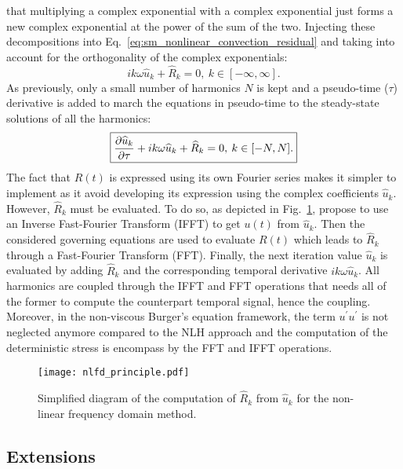 that multiplying a complex exponential with a complex exponential
just forms a new complex exponential at the power of the sum of the
two.
Injecting these decompositions into 
Eq.~\eqref{eq:sm_nonlinear_convection_residual} and taking into account
for the orthogonality of the complex exponentials:
\begin{equation}
	i k \omega \widehat{u}_k + \widehat{R}_k = 0, \: k \in [-\infty, \infty].
\end{equation}
As previously, only a small number of harmonics $N$ is kept and 
a pseudo-time ($\tau$) derivative is added to march the equations
in pseudo-time to the steady-state solutions of all the harmonics:
\begin{equation}
	\fbox{$
	\displaystyle \frac{\partial \widehat{u}_k}{\partial \tau} + 
	i k \omega \widehat{u}_k + \widehat{R}_k = 0, \: k \in [-N, N].
	$}
	\label{eq:sm_nlfd_subset_eq}
\end{equation}
The fact that $R(t)$ is expressed using its own Fourier series 
makes it simpler to implement 
as it avoid developing its expression using 
the complex coefficients $\widehat{u}_k$. 
However, $\widehat{R}_k$ must be evaluated. To do so, as depicted
in Fig.~\ref{fig:nlfd_principle}, \citet{McMullen2001}
propose to use an Inverse Fast-Fourier Transform (IFFT) to get
$u(t)$ from $\widehat{u}_k$. Then the considered governing equations
are used to evaluate $R(t)$ which leads to $\widehat{R}_k$
through a Fast-Fourier Transform (FFT). Finally, the next iteration value 
$\widehat{u}_k$
is evaluated by adding $\widehat{R}_k$ and 
the corresponding temporal derivative $i k \omega \widehat{u}_k$. All
harmonics are coupled through the IFFT and FFT operations
that needs all of the former to compute the counterpart temporal signal,
hence the coupling. Moreover, 
in the non-viscous Burger's equation framework, 
the term $u^\prime u^\prime$ is not neglected anymore compared to the
NLH approach and the computation of the deterministic stress is encompass
by the FFT and IFFT operations.
\begin{figure}[htbp]
  \centering
  \texttt{[image: nlfd\_principle.pdf]}
  \caption{Simplified diagram of the computation of $\widehat{R}_k$ from $\widehat{u}_k$
  for the non-linear frequency domain method.}
  \label{fig:nlfd_principle}
\end{figure}

\subsection{Extensions}

